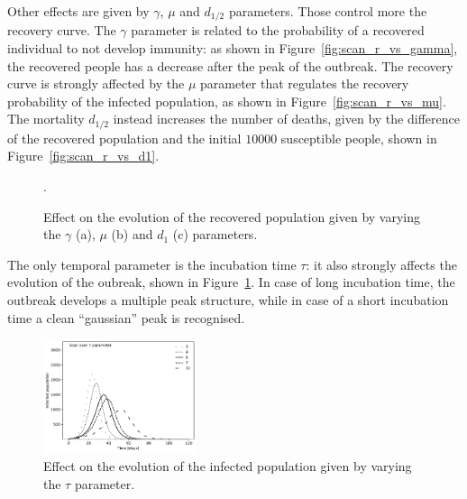 Other effects are given by $\gamma$, $\mu$ and $d_{1/2}$ parameters. Those control more the recovery curve. The $\gamma$ parameter is related to the probability of a recovered individual to not develop immunity: as shown in Figure~\ref{fig:scan_r_vs_gamma}, the recovered people has a decrease after the peak of the outbreak. The recovery curve is strongly affected by the $\mu$ parameter that regulates the recovery probability of the infected population, as shown in Figure~\ref{fig:scan_r_vs_mu}. The mortality $d_{1/2}$ instead increases the number of deaths, given by the difference of the recovered population and the initial $10000$ susceptible people, shown in Figure~\ref{fig:scan_r_vs_d1}.

\begin{figure}[!ht]\centering
{}
\caption{Effect on the evolution of the recovered population given by varying the $\gamma$ (a), $\mu$ (b) and $d_1$ (c) parameters.}.
\end{figure}

The only temporal parameter is the incubation time $\tau$: it also strongly affects the evolution of the oubreak, shown in Figure~\ref{fig:scan_i_vs_tau}. In case of long incubation time, the outbreak develops a  multiple peak structure, while in case of a short incubation time a clean ``gaussian'' peak is recognised.

\begin{figure}[!ht]\centering
\includegraphics[width=0.4\textwidth]{imgs/ModelDescription/Scan_I_vs_tau_parameters_alternative.pdf}
\caption{Effect on the evolution of the infected population given by varying the $\tau$ parameter.}
\label{fig:scan_i_vs_tau}
\end{figure}
